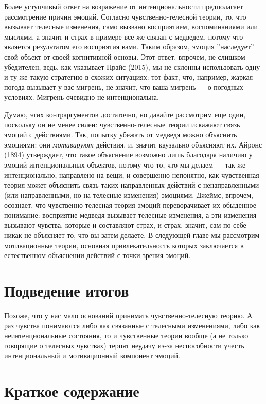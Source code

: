 \documentclass[11pt]{book}
\begin{document}
Более уступчивый ответ на возражение от интенциональности предполагает рассмотрение причин эмоций. Согласно чувственно-телесной теории, то, что вызывает телесные изменения, само вызвано восприятием, воспоминаниями или мыслями, а значит и страх в примере все же связан с медведем, потому что является результатом его восприятия вами. Таким образом, эмоция ''наследует'' свой объект от своей когнитивной основы. Этот ответ, впрочем, не слишком убедителен, ведь, как указывает Прайс (2015), мы не склонны использовать одну и ту же такую стратегию в схожих ситуациях: тот факт, что, например, жаркая погода вызывает у вас мигрень, не значит, что ваша мигрень --- о погодных условиях. Мигрень очевидно не интенциональна.

Думаю, этих контраргументов достаточно, но давайте рассмотрим еще один, поскольку он не менее силен: чувственно-телесные теории искажают связь эмоций с действиями. Так, попытку убежать от медведя можно объяснить эмоциями: они \textit{мотивируют} действия, и, значит каузально объясняют их. Айронс (1894) утверждает, что такое объяснение возможно лишь благодаря наличию у эмоций интенциональных объектов, потому что то, что мы делаем --- так же интенционально, направлено на вещи, и совершенно непонятно, как чувственная теория может объяснить связь таких направленных действий с ненаправленными (или направленными, но на телесные изменения) эмоциями. Джеймс, впрочем, осознает, что чувственно-телесная теория эмоций переворачивает их обыденное понимание: восприятие медведя вызывает телесные изменения, а эти изменения вызывают чувства, которые и составляют страх, и страх, значит, сам по себе никак не объясняет то, что вы затем делаете. В следующей главе мы рассмотрим мотивационные теории, основная привлекательность которых заключается в естественном объяснении действий с точки зрения эмоций.

\section{Подведение итогов}

Похоже, что у нас мало оснований принимать чувственно-телесную теорию. А раз чувства понимаются либо как связанные с телесными изменениями, либо как неинтенциональные состояния, то и чувственные теории вообще (а не только говорящие о телесных чувствах) терпят неудачу из-за неспособности учесть интенциональный и мотивационный компонент эмоций.

\section{Краткое содержание}
\end{document}
